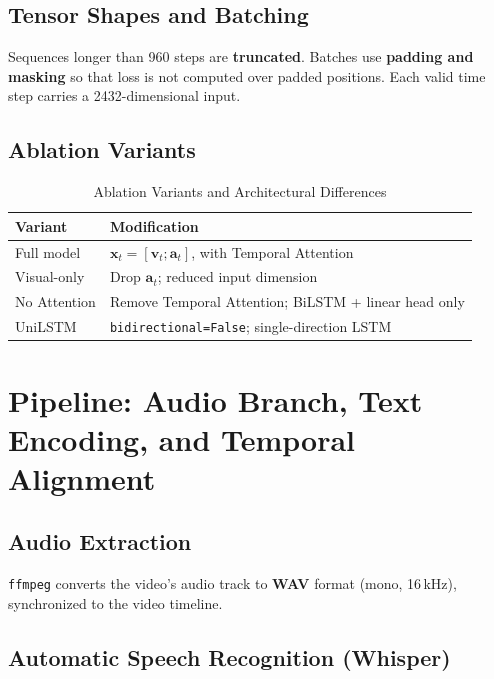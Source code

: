 \documentclass[10pt,conference]{IEEEtran}
\begin{document}
\subsection{Tensor Shapes and Batching}

Sequences longer than 960 steps are \textbf{truncated}. Batches use
\textbf{padding and masking} so that loss is not computed over padded
positions. Each valid time step carries a 2432-dimensional input.

\subsection{Ablation Variants}

\begin{table}[h]
\centering
\caption{Ablation Variants and Architectural Differences}
\label{tab:ablations}
\begin{tabular}{ll}
\toprule
\textbf{Variant} & \textbf{Modification} \\
\midrule
Full model   & $\mathbf{x}_t = [\mathbf{v}_t;\mathbf{a}_t]$, with Temporal Attention \\
Visual-only  & Drop $\mathbf{a}_t$; reduced input dimension \\
No Attention & Remove Temporal Attention; BiLSTM + linear head only \\
UniLSTM      & \texttt{bidirectional=False}; single-direction LSTM \\
\bottomrule
\end{tabular}
\end{table}

\section{Pipeline: Audio Branch, Text Encoding, and Temporal Alignment}
\label{sec:audio}

\subsection{Audio Extraction}

\texttt{ffmpeg} converts the video's audio track to \textbf{WAV} format
(mono, 16\,kHz), synchronized to the video timeline.

\subsection{Automatic Speech Recognition (Whisper)}
\end{document}
